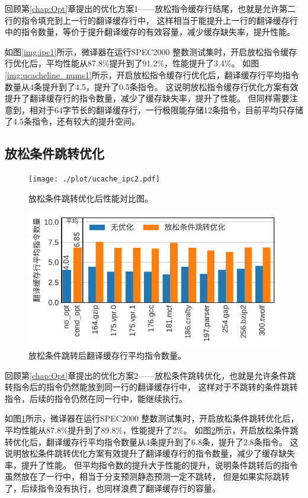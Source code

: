 回顾第\ref{chap:Opt}章提出的优化方案1——放松指令缓存行结尾，也就是允许第二行的指令填充到上一行的翻译缓存行中，
这样相当于能提升上一行的翻译缓存行中的指令数量，等价于提升翻译缓存的有效容量，减少缓存缺失率，提升性能。

如图\ref{img:ipc1}所示，微译器在运行SPEC2000 整数测试集时，开启放松指令缓存行优化后，平均性能从87.8\%提升到了91.2\%，性能提升了3.4\%。
如图\ref{img:ucacheline_nums1}所示，开启放松指令缓存行优化后，翻译缓存行平均指令数量从4条提升到了4.5，提升了0.5条指令。
这说明放松指令缓存行优化方案有效提升了翻译缓存行的指令数量，减少了缓存缺失率，提升了性能。
但同样需要注意到，相对于64字节长的翻译缓存行，一行极限能存储12条指令，目前平均只存储了4.5条指令，还有较大的提升空间。

\subsection{放松条件跳转优化}

\begin{figure}[!htbp]
  \centering
  \texttt{[image: ./plot/ucache\_ipc2.pdf]}
  \caption{放松条件跳转优化后性能对比图。}
  \label{img:ipc2}
\end{figure}

\begin{figure}[!htbp]
  \centering
  \includegraphics[width=0.8\linewidth]{./plot/ucacheline_nums2.pdf}
  \caption{放松条件跳转后翻译缓存行平均指令数量。}
  \label{img:ucacheline_nums2}
\end{figure}

回顾第\ref{chap:Opt}章提出的优化方案2——放松条件跳转优化，也就是允许条件跳转指令后的指令仍然能放到同一行的翻译缓存行中，
这样对于不跳转的条件跳转指令，后续的指令仍然在同一行中，能继续执行。

如图\ref{img:ipc2}所示，微译器在运行SPEC2000 整数测试集时，开启放松条件跳转优化后，平均性能从87.8\%提升到了89.8\%，性能提升了2\%。
如图\ref{img:ucacheline_nums2}所示，开启放松条件跳转优化后，翻译缓存行平均指令数量从4条提升到了6.8条，提升了2.8条指令。
这说明放松条件跳转优化方案有效提升了翻译缓存行的指令数量，减少了缓存缺失率，提升了性能。
但平均指令数的提升大于性能的提升，说明条件跳转后的指令虽然放在了一行中，相当于分支预测静态预测一定不跳转，
但是如果实际跳转了，后续指令没有执行，也同样浪费了翻译缓存行的容量。



